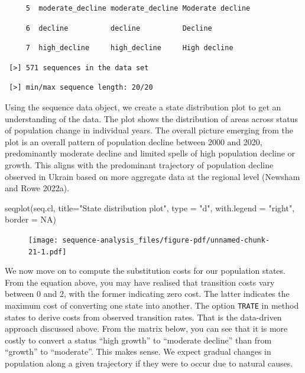 \documentclass[
  letterpaper,
  DIV=11,
  numbers=noendperiod]{scrreprt}
\newenvironment{Shaded}{\begin{snugshade}}{\end{snugshade}}
\newcommand{\AttributeTok}[1]{\textcolor[rgb]{0.40,0.45,0.13}{#1}}
\newcommand{\ConstantTok}[1]{\textcolor[rgb]{0.56,0.35,0.01}{#1}}
\newcommand{\FunctionTok}[1]{\textcolor[rgb]{0.28,0.35,0.67}{#1}}
\newcommand{\NormalTok}[1]{\textcolor[rgb]{0.00,0.23,0.31}{#1}}
\newcommand{\StringTok}[1]{\textcolor[rgb]{0.13,0.47,0.30}{#1}}
\begin{document}
\begin{verbatim}
     5  moderate_decline moderate_decline Moderate decline
\end{verbatim}

\begin{verbatim}
     6  decline          decline          Decline
\end{verbatim}

\begin{verbatim}
     7  high_decline     high_decline     High decline
\end{verbatim}

\begin{verbatim}
 [>] 571 sequences in the data set
\end{verbatim}

\begin{verbatim}
 [>] min/max sequence length: 20/20
\end{verbatim}

Using the sequence data object, we create a state distribution plot to
get an understanding of the data. The plot shows the distribution of
areas across status of population change in individual years. The
overall picture emerging from the plot is an overall pattern of
population decline between 2000 and 2020, predominantly moderate decline
and limited spells of high population decline or growth. This aligns
with the predominant trajectory of population decline observed in Ukrain
based on more aggregate data at the regional level (Newsham and Rowe
2022a).

\begin{Shaded}
\begin{Highlighting}[]
\FunctionTok{seqplot}\NormalTok{(seq.cl, }
        \AttributeTok{title=}\StringTok{"State distribution plot"}\NormalTok{, }
        \AttributeTok{type =} \StringTok{"d"}\NormalTok{,}
        \AttributeTok{with.legend =} \StringTok{"right"}\NormalTok{,}
        \AttributeTok{border =} \ConstantTok{NA}\NormalTok{)}
\end{Highlighting}
\end{Shaded}

\begin{figure}[H]

{\centering \texttt{[image: sequence-analysis\_files/figure-pdf/unnamed-chunk-21-1.pdf]}

}

\end{figure}

We now move on to compute the substitution costs for our population
states. From the equation above, you may have realised that transition
costs vary between 0 and 2, with the former indicating zero cost. The
latter indicates the maximum cost of converting one state into another.
The option \texttt{TRATE} in method states to derive costs from observed
transition rates. That is the data-driven approach discussed above. From
the matrix below, you can see that it is more costly to convert a status
``high growth'' to ``moderate decline'' than from ``growth'' to
``moderate''. This makes sense. We expect gradual changes in population
along a given trajectory if they were to occur due to natural causes.
\end{document}
